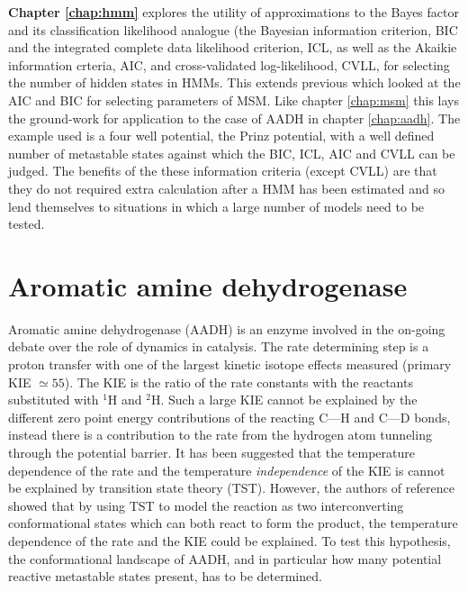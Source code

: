 \textbf{Chapter \ref{chap:hmm}} explores the utility of approximations to the Bayes factor and its classification likelihood analogue (the Bayesian information criterion, BIC\cite{schwarzEstimatingDimensionModel1978a} and the integrated complete data likelihood criterion, ICL\cite{biernackiAssessingMixtureModel2000a}, as well as the Akaikie information crteria, AIC\cite{akaikeInformationTheoryExtension1998}, and cross-validated log-likelihood, CVLL\cite{celeuxSelectingHiddenMarkov2008}, for selecting the number of hidden states in HMMs. This extends previous\cite{mcgibbonStatisticalModelSelection2014a} which looked at the AIC and BIC for selecting parameters of MSM. Like chapter \ref{chap:msm} this lays the ground-work for application to the case of AADH in chapter \ref{chap:aadh}. The example used is a four well potential, the Prinz potential\cite{prinzMarkovModelsMolecular2011}, with a well defined number of metastable states against which the BIC, ICL, AIC and CVLL can be judged. The benefits of the these information criteria (except CVLL) are that they do not required extra calculation after a HMM has been estimated and so lend themselves to situations in which a large number of models need to be tested. 

\section{Aromatic amine dehydrogenase}
Aromatic amine dehydrogenase (AADH) is an enzyme involved in the on-going debate over the role of dynamics in catalysis\cite{glowackiTakingOckhamRazor2012b,glowackiProteinDynamicsEnzyme2012a,mcgeaghProteinDynamicsEnzyme2011}. The rate determining step is a proton transfer with one of the largest kinetic isotope effects measured (primary KIE $\simeq 55$)\cite{masgrauTunnelingClassicalPaths2007}. The KIE is the ratio of the rate constants with the reactants substituted with $^1$H and $^{2}$H. Such a large KIE cannot be explained by the different zero point energy contributions of the reacting C---H and C---D bonds, instead there is a contribution to the rate from the hydrogen atom tunneling through the potential barrier\cite{masgrauTunnelingClassicalPaths2007,antoniouLargeKineticIsotope1997, basranImportanceBarrierShape2001a,sutcliffeHydrogenTunnellingEnzymecatalysed2006}. It has been suggested that the temperature dependence of the rate and the temperature \emph{independence} of the KIE is cannot be explained by transition state theory (TST)\cite{agrawalVibrationallyEnhancedHydrogen2004,kohenEnzymeCatalysisClassical1998}. However, the authors of reference \cite{glowackiProteinDynamicsEnzyme2012a} showed that by using TST to model the reaction as two interconverting conformational states which can both react to form the product, the temperature dependence of the rate and the KIE could be explained. To test this hypothesis, the conformational landscape of AADH, and in particular how many potential reactive metastable states present, has to be determined. 

